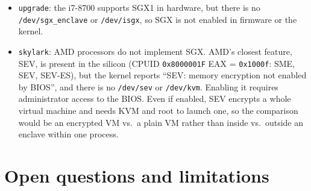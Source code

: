 \documentclass[11pt]{article}
\newcommand{\up}{\texttt{upgrade}}
\newcommand{\sk}{\texttt{skylark}}
\begin{document}
\begin{itemize}
\item \up{}: the i7-8700 supports SGX1 in hardware, but there is no
  \texttt{/dev/sgx\_enclave} or \texttt{/dev/isgx}, so SGX is not enabled in
  firmware or the kernel.
\item \sk{}: AMD processors do not implement SGX. AMD's closest feature,
  SEV, is present in the silicon (CPUID \texttt{0x8000001F} EAX =
  \texttt{0x1000f}: SME, SEV, SEV-ES), but the kernel reports
  ``SEV: memory encryption not enabled by BIOS'', and there is no
  \texttt{/dev/sev} or \texttt{/dev/kvm}. Enabling it requires
  administrator access to the BIOS. Even if enabled, SEV encrypts a whole
  virtual machine and needs KVM and root to launch one, so the comparison
  would be an encrypted VM vs.\ a plain VM rather than inside vs.\ outside an
  enclave within one process.
\end{itemize}

\section{Open questions and limitations}
\label{sec:open}
\end{document}
